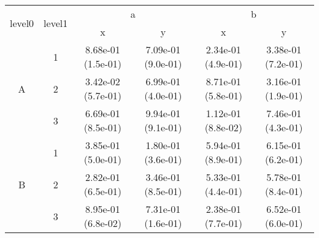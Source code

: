 \begin{tabular}{cccccc}
\toprule
\multirow{2}{*}{level0} & \multirow{2}{*}{level1}&\multicolumn{2}{c}{a}&\multicolumn{2}{c}{b}\tabularnewline
\cmidrule(lr){3-4}
\cmidrule(lr){5-6}
&&x&y&x&y\tabularnewline
\midrule
\multirow{3}{*}{A}&1& 8.68e-01 (1.5e-01)& 7.09e-01 (9.0e-01)& 2.34e-01 (4.9e-01)& 3.38e-01 (7.2e-01)\tabularnewline
&2& 3.42e-02 (5.7e-01)& 6.99e-01 (4.0e-01)& 8.71e-01 (5.8e-01)& 3.16e-01 (1.9e-01)\tabularnewline
&3& 6.69e-01 (8.5e-01)& 9.94e-01 (9.1e-01)& 1.12e-01 (8.8e-02)& 7.46e-01 (4.3e-01)\tabularnewline
\midrule
\multirow{3}{*}{B}&1& 3.85e-01 (5.0e-01)& 1.80e-01 (3.6e-01)& 5.94e-01 (8.9e-01)& 6.15e-01 (6.2e-01)\tabularnewline
&2& 2.82e-01 (6.5e-01)& 3.46e-01 (8.5e-01)& 5.33e-01 (4.4e-01)& 5.78e-01 (8.4e-01)\tabularnewline
&3& 8.95e-01 (6.8e-02)& 7.31e-01 (1.6e-01)& 2.38e-01 (7.7e-01)& 6.52e-01 (6.0e-01)\tabularnewline
\bottomrule
\end{tabular}
